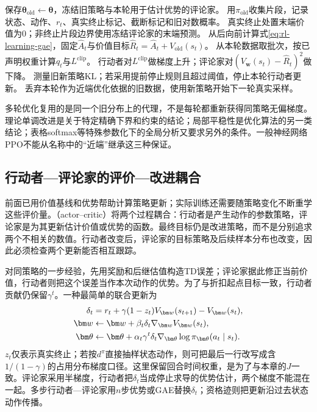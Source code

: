 \begin{algorithm}
  \label{alg:rl-learning-ppo}
  \begin{algorithmic}[1]
    \State 保存$\bm\theta_{\mathrm{old}}\gets\bm\theta$，冻结旧策略与本轮用于估计优势的评论家。
    \State 用$\pi_{\mathrm{old}}$收集片段，记录状态、动作、$r_t$、真实终止标记、截断标记和旧对数概率。
    \State 真实终止处置末端价值为0；非终止片段边界使用冻结评论家的末端预测。
    \State 从后向前计算式\eqref{eq:rl-learning-gae}，固定$\widehat A_t$与价值目标$\widehat R_t=\widehat A_t+V_{\mathrm{old}}(s_t)$。
      \State 从本轮数据取批次，按已声明权重计算$q_t$与$L^{\mathrm{clip}}$。
      \State 行动者对$L^{\mathrm{clip}}$做梯度上升；评论家对$(V_{\bm w}(s_t)-\widehat R_t)^2$做下降。
      \State 测量旧新策略KL；若采用提前停止规则且超过阈值，停止本轮行动者更新。
    \EndFor
    \State 丢弃本轮作为近端优化依据的旧数据，使用新策略开始下一轮真实采样。
  \end{algorithmic}
\end{algorithm}

多轮优化复用的是同一个旧分布上的代理，不是每轮都重新获得同策略无偏梯度。理论单调改进是关于特定精确下界和约束的结论；局部平稳性是优化算法的另一类结论；表格softmax等特殊参数化下的全局分析又要求另外的条件。一般神经网络PPO不能从名称中的“近端”继承这三种保证。

\subsection{行动者—评论家的评价—改进耦合}
\label{sec:rl-learning-actor-critic}

前面已用价值基线和优势帮助计算策略更新；实际训练还需要随策略变化不断重学这些评价量。（actor--critic）将两个过程耦合：行动者是产生动作的参数策略，评论家是为其更新估计价值或优势的函数。最终目标仍是改进策略，而不是分别追求两个不相关的数值。行动者改变后，评论家的目标策略及后续样本分布也改变，因此必须检查两个更新能否相互跟踪。

对同策略的一步经验，先用奖励和后继估值构造TD误差；评论家据此修正当前价值，行动者则把这个误差当作本次动作的优势。为了与折扣起点目标一致，行动者贡献仍保留$\gamma^t$。一种最简单的联合更新为
\begin{align}
  \delta_t&=r_t+\gamma(1-z_t)V_{\bm w}(s_{t+1})-V_{\bm w}(s_t),
       \notag\\
  \bm w&\gets\bm w+\beta_t\delta_t\nabla_{\bm w}V_{\bm w}(s_t),
       \notag\\
  \bm\theta&\gets\bm\theta+
       \alpha_t\gamma^t\delta_t
          \nabla_{\bm\theta}\log\pi_{\bm\theta}(a_t\mid s_t).
  \label{eq:rl-learning-one-step-ac}
\end{align}
$z_t$仅表示真实终止；若按$d^\pi$直接抽样状态动作，则可把最后一行改写成含$1/(1-\gamma)$的占用分布梯度口径。这里保留回合时间权重，是为了与本章的$J$一致。评论家采用半梯度，行动者把$\delta_t$当成停止求导的优势估计，两个梯度不能混在一起。多步行动者—评论家用$n$步优势或GAE替换$\delta_t$；资格迹则把更新沿过去状态动作传播。

